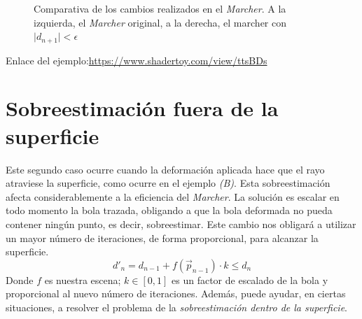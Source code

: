 \begin{figure}[H]
  \centering
  \captionsetup{justification=centering}%
  \hfill
  \caption{Comparativa de los cambios realizados en el \textit{Marcher}. A la izquierda, el \textit{Marcher} original, a la derecha, el marcher con \(\vert d_{n+1}\vert < \epsilon\)}
\end{figure}

Enlace del ejemplo:\url{https://www.shadertoy.com/view/ttsBDs}

\section{Sobreestimación fuera de la superficie}
Este segundo caso ocurre cuando la deformación aplicada hace que el rayo atraviese la superficie, como ocurre en el ejemplo \textit{(B)}.
Esta sobreestimación afecta considerablemente a la eficiencia del \textit{Marcher}. La solución es escalar en todo momento la bola trazada, obligando a que la bola deformada no pueda contener ningún punto, es decir, sobreestimar. Este cambio nos obligará a utilizar un mayor número de iteraciones, de forma proporcional, para alcanzar la superficie.
\[d'_{n}=d_{n-1} + f(\Vec{p}_{n-1})\cdot k \leq d_{n}\]
Donde \(f\) es nuestra escena; \(k\in[0,1]\) es un factor de escalado de la bola y proporcional al nuevo número de iteraciones. Además, puede ayudar, en ciertas situaciones, a resolver el problema de la \textit{sobreestimación dentro de la superficie}.

